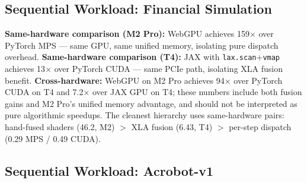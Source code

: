 \documentclass[sigconf,nonacm]{acmart}
\begin{document}
\subsection{Sequential Workload: Financial Simulation}

\begin{table}[h]
\caption{Financial Simulation (POP=10,000, 246 params, 1,500 timesteps)}
\label{tab:financial}
\end{table}

\textbf{Same-hardware comparison (M2 Pro):} WebGPU achieves 159$\times$ over PyTorch MPS --- same GPU, same unified memory, isolating pure dispatch overhead. \textbf{Same-hardware comparison (T4):} JAX with \texttt{lax.scan}+\texttt{vmap} achieves 13$\times$ over PyTorch CUDA --- same PCIe path, isolating XLA fusion benefit. \textbf{Cross-hardware:} WebGPU on M2 Pro achieves 94$\times$ over PyTorch CUDA on T4 and 7.2$\times$ over JAX GPU on T4; these numbers include both fusion gains and M2 Pro's unified memory advantage, and should not be interpreted as pure algorithmic speedups. The cleanest hierarchy uses same-hardware pairs: hand-fused shaders (46.2, M2) $>$ XLA fusion (6.43, T4) $>$ per-step dispatch (0.29 MPS / 0.49 CUDA).

\subsection{Sequential Workload: Acrobot-v1}
\end{document}
